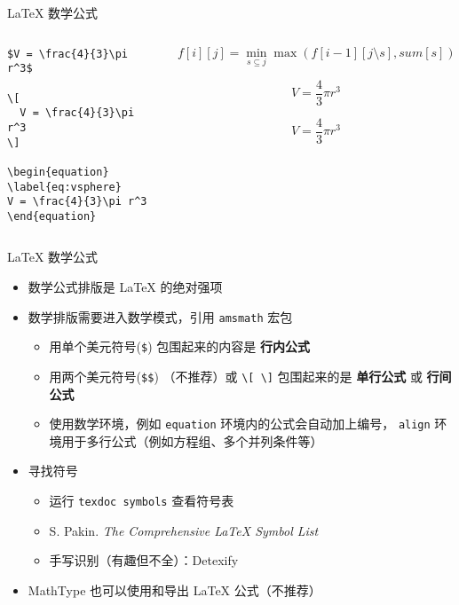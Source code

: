 \begin{frame}[fragile]{\LaTeX{} 数学公式}

  \begin{columns}
    \begin{column}{.5\textwidth}
      \begin{lstlisting}[basicstyle=\ttfamily\small]
$V = \frac{4}{3}\pi r^3$

\[
  V = \frac{4}{3}\pi r^3
\]

\begin{equation}
\label{eq:vsphere}
V = \frac{4}{3}\pi r^3
\end{equation}
\end{lstlisting}
    \end{column}

    \begin{column}{.5\textwidth}
      $f[i][j]=\min\limits_{s \subseteq j}\max(f[i-1][j\setminus s],sum[s])$

      \[
        V = \frac{4}{3}\pi r^3
      \]

      \begin{equation}
        \label{eq:vsphere}
        V = \frac{4}{3}\pi r^3
      \end{equation}
    \end{column}
  \end{columns}

\end{frame}

\begin{frame}[fragile]{\LaTeX{} 数学公式}
  \begin{itemize}
    \item 数学公式排版是 \LaTeX{} 的绝对强项
    \item 数学排版需要进入数学模式，引用 \texttt{amsmath} 宏包
          \begin{itemize}
            \item 用单个美元符号(\verb|$|) 包围起来的内容是 {\bf 行内公式}
            \item 用两个美元符号(\verb|$$|) （不推荐）或
                  \verb|\[ \]| 包围起来的是 {\bf 单行公式} 或 {\bf 行间公式}
            \item 使用数学环境，例如 \texttt{equation} 环境内的公式会自动加上编号，
                  \texttt{align} 环境用于多行公式（例如方程组、多个并列条件等）
          \end{itemize}
    \item 寻找符号
          \begin{itemize}
            \item 运行 \texttt{texdoc symbols} 查看符号表
            \item S. Pakin. \emph{The Comprehensive \LaTeX{} Symbol List}
            \item 手写识别（有趣但不全）：Detexify 
          \end{itemize}
    \item MathType 也可以使用和导出 \LaTeX{} 公式（不推荐）
  \end{itemize}
\end{frame}

